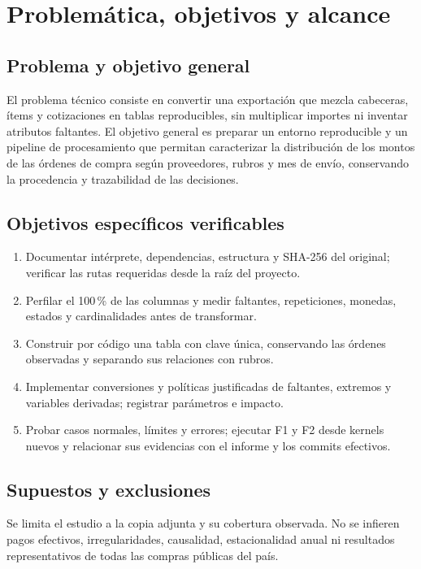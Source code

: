 \documentclass[12pt,letterpaper]{article}
\newcommand{\archivo}[1]{\path{#1}}
\begin{document}
\section{Problemática, objetivos y alcance}

\subsection{Problema y objetivo general}

El problema técnico consiste en convertir una exportación que mezcla cabeceras,
ítems y cotizaciones en tablas reproducibles, sin multiplicar importes ni inventar
atributos faltantes. El objetivo general es preparar un entorno reproducible y un
pipeline de procesamiento que permitan caracterizar la distribución de los montos
de las órdenes de compra según proveedores, rubros y mes de envío, conservando la
procedencia y trazabilidad de las decisiones.

\subsection{Objetivos específicos verificables}

\begin{enumerate}
\item Documentar intérprete, dependencias, estructura y SHA-256 del original;
verificar las rutas requeridas desde la raíz del proyecto.
\item Perfilar el 100\,\% de las columnas y medir faltantes, repeticiones, monedas,
estados y cardinalidades antes de transformar.
\item Construir por código una tabla con clave \archivo{codigoOC} única,
conservando las órdenes observadas y separando sus relaciones con rubros.
\item Implementar conversiones y políticas justificadas de faltantes, extremos y
variables derivadas; registrar parámetros e impacto.
\item Probar casos normales, límites y errores; ejecutar F1 y F2 desde kernels
nuevos y relacionar sus evidencias con el informe y los commits efectivos.
\end{enumerate}

\subsection{Supuestos y exclusiones}

Se limita el estudio a la copia adjunta y su cobertura observada. No se infieren
pagos efectivos, irregularidades, causalidad, estacionalidad anual ni resultados
representativos de todas las compras públicas del país.
\end{document}
